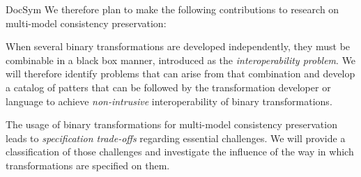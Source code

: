 \begin{copiedFrom}{DocSym}
We therefore plan to make the following contributions to research on multi-model consistency preservation:
\begin{description}[leftmargin=\parindent]
    \item[Transformation interoperability.] %
        When several binary transformations are developed independently, they must be combinable in a black box manner, introduced as the \emph{interoperability problem}. We will therefore identify problems that can arise from that combination %
        and develop a catalog of patters that can be followed by the transformation developer or language to achieve \emph{non-intrusive} interoperability of binary transformations.
    \item[Decomposition of consistency relations.] 
        The usage of binary transformations for multi-model consistency preservation leads to \emph{specification trade-offs} regarding essential challenges. We will provide a classification of those challenges and investigate the influence of the way in which transformations are specified on them.

\end{description}
\end{copiedFrom}
